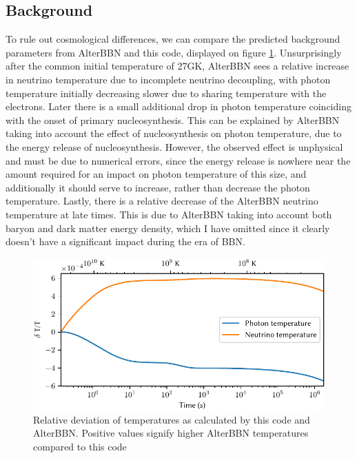 \subsection{Background}
To rule out cosmological differences, we can compare the predicted background parameters from AlterBBN and this code, displayed on figure \ref{fig:comparetemp}. Unsurprisingly after the common initial temperature of 27GK, AlterBBN sees a relative increase in neutrino temperature due to incomplete neutrino decoupling, with photon temperature initially decreasing slower due to sharing temperature with the electrons. Later there is a small additional drop in photon temperature coinciding with the onset of primary nucleosynthesis. This can be explained by AlterBBN taking into account the effect of nucleosynthesis on photon temperature, due to the energy release of nucleosynthesis. However, the observed effect is unphysical and must be due to numerical errors, since the energy release is nowhere near the amount required for an impact on photon temperature of this size, and additionally it should serve to increase, rather than decrease the photon temperature. Lastly, there is a relative decrease of the AlterBBN neutrino temperature at late times. This is due to AlterBBN taking into account both baryon and dark matter energy density, which I have omitted since it clearly doesn't have a significant impact during the era of BBN.
\begin{figure}[ht]
    \includegraphics[width=5.1in]{figures/comparetemp.pdf}
    \caption{Relative deviation of temperatures as calculated by this code and AlterBBN. Positive values signify higher AlterBBN temperatures compared to this code}
    \label{fig:comparetemp}
\end{figure}

